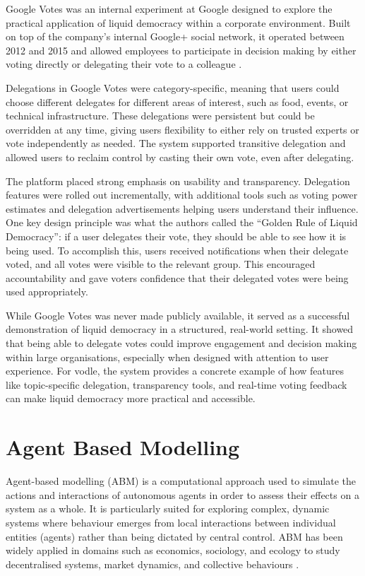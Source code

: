 Google Votes was an internal experiment at Google designed to explore the practical application of liquid democracy within a corporate environment. Built on top of the company's internal Google+ social network, it operated between 2012 and 2015 and allowed employees to participate in decision making by either voting directly or delegating their vote to a colleague \citep{hardt_google_2015}.

Delegations in Google Votes were category-specific, meaning that users could choose different delegates for different areas of interest, such as food, events, or technical infrastructure. These delegations were persistent but could be overridden at any time, giving users flexibility to either rely on trusted experts or vote independently as needed. The system supported transitive delegation and allowed users to reclaim control by casting their own vote, even after delegating.

The platform placed strong emphasis on usability and transparency. Delegation features were rolled out incrementally, with additional tools such as voting power estimates and delegation advertisements helping users understand their influence. One key design principle was what the authors called the ``Golden Rule of Liquid Democracy'': if a user delegates their vote, they should be able to see how it is being used. To accomplish this, users received notifications when their delegate voted, and all votes were visible to the relevant group. This encouraged accountability and gave voters confidence that their delegated votes were being used appropriately.

While Google Votes was never made publicly available, it served as a successful demonstration of liquid democracy in a structured, real-world setting. It showed that being able to delegate votes could improve engagement and decision making within large organisations, especially when designed with attention to user experience. For vodle, the system provides a concrete example of how features like topic-specific delegation, transparency tools, and real-time voting feedback can make liquid democracy more practical and accessible.
\section{Agent Based Modelling}\label{sec:background_abm}
Agent-based modelling (ABM) is a computational approach used to simulate the actions and interactions of autonomous agents in order to assess their effects on a system as a whole. It is particularly suited for exploring complex, dynamic systems where behaviour emerges from local interactions between individual entities (agents) rather than being dictated by central control. ABM has been widely applied in domains such as economics, sociology, and ecology to study decentralised systems, market dynamics, and collective behaviours \citep{bonabeau2002agent}.

